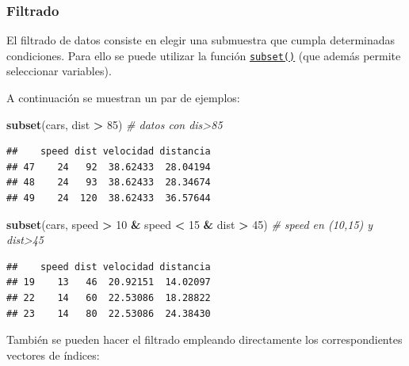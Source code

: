 \documentclass[
]{book}
\newenvironment{Shaded}{\begin{snugshade}}{\end{snugshade}}
\newcommand{\CommentTok}[1]{\textcolor[rgb]{0.56,0.35,0.01}{\textit{#1}}}
\newcommand{\DecValTok}[1]{\textcolor[rgb]{0.00,0.00,0.81}{#1}}
\newcommand{\FunctionTok}[1]{\textcolor[rgb]{0.13,0.29,0.53}{\textbf{#1}}}
\newcommand{\NormalTok}[1]{#1}
\newcommand{\OtherTok}[1]{\textcolor[rgb]{0.56,0.35,0.01}{#1}}
\newcommand{\SpecialCharTok}[1]{\textcolor[rgb]{0.81,0.36,0.00}{\textbf{#1}}}
\begin{document}
\subsubsection{Filtrado}\label{filtrado}

El filtrado de datos consiste en
elegir una submuestra que cumpla determinadas condiciones. Para ello se
puede utilizar la función \href{https://www.rdocumentation.org/packages/base/versions/3.6.1/topics/subset}{\texttt{subset()}}
(que además permite seleccionar variables).

A continuación se muestran un par de ejemplos:

\begin{Shaded}
\begin{Highlighting}[]
\FunctionTok{subset}\NormalTok{(cars, dist }\SpecialCharTok{\textgreater{}} \DecValTok{85}\NormalTok{) }\CommentTok{\# datos con dis\textgreater{}85}
\end{Highlighting}
\end{Shaded}

\begin{verbatim}
##    speed dist velocidad distancia
## 47    24   92  38.62433  28.04194
## 48    24   93  38.62433  28.34674
## 49    24  120  38.62433  36.57644
\end{verbatim}

\begin{Shaded}
\begin{Highlighting}[]
\FunctionTok{subset}\NormalTok{(cars, speed }\SpecialCharTok{\textgreater{}} \DecValTok{10} \SpecialCharTok{\&}\NormalTok{ speed }\SpecialCharTok{\textless{}} \DecValTok{15} \SpecialCharTok{\&}\NormalTok{ dist }\SpecialCharTok{\textgreater{}} \DecValTok{45}\NormalTok{) }\CommentTok{\# speed en (10,15) y dist\textgreater{}45}
\end{Highlighting}
\end{Shaded}

\begin{verbatim}
##    speed dist velocidad distancia
## 19    13   46  20.92151  14.02097
## 22    14   60  22.53086  18.28822
## 23    14   80  22.53086  24.38430
\end{verbatim}

También se pueden hacer el filtrado empleando directamente los
correspondientes vectores de índices:

\begin{Shaded}
\end{Shaded}
\end{document}
